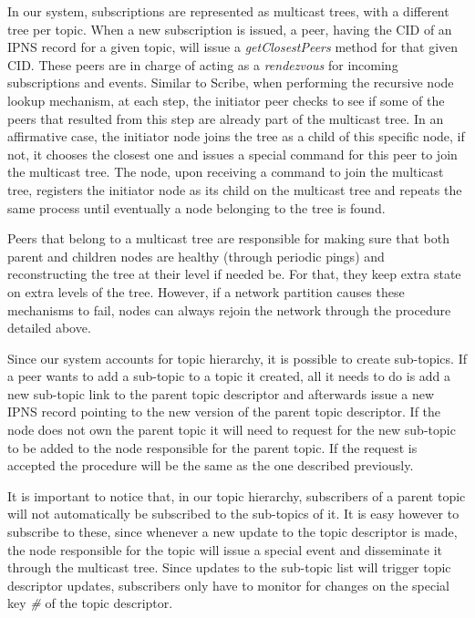 In our system, subscriptions are represented as multicast trees, with a
different tree per topic. When a new subscription is issued, a peer,
having the CID of an IPNS record for a given topic, will issue a
\emph{getClosestPeers} method for that given CID. These peers are in
charge of acting as a \emph{rendezvous} for incoming subscriptions and
events. Similar to Scribe, when performing the recursive node lookup
mechanism, at each step, the initiator peer checks to see if some of the
peers that resulted from this step are already part of the multicast
tree. In an affirmative case, the initiator node joins the tree as a
child of this specific node, if not, it chooses the closest one and
issues a special command for this peer to join the multicast tree. The
node, upon receiving a command to join the multicast tree, registers the
initiator node as its child on the multicast tree and repeats the
same process until eventually a node belonging to the tree is found.

Peers that belong to a multicast tree are responsible for making sure
that both parent and children nodes are healthy (through periodic pings)
and reconstructing the tree at their level if needed be. For that, they
keep extra state on extra levels of the tree. However, if a network
partition causes these mechanisms to fail, nodes can always rejoin the
network through the procedure detailed above.

Since our system accounts for topic hierarchy, it is possible to create
sub-topics. If a peer wants to add a sub-topic to a topic it created,
all it needs to do is add a new sub-topic link to the parent topic
descriptor and afterwards issue a new IPNS record pointing to the new
version of the parent topic descriptor. If the node does not own the
parent topic it will need to request for the new sub-topic to be added
to the node responsible for the parent topic. If the request is accepted
the procedure will be the same as the one described previously.

It is important to notice that, in our topic hierarchy, subscribers of a
parent topic will not automatically be subscribed to the sub-topics of
it. It is easy however to subscribe to these, since whenever a new
update to the topic descriptor is made, the node responsible for the
topic will issue a special event and disseminate it through the
multicast tree. Since updates to the sub-topic list will trigger topic
descriptor updates, subscribers only have to monitor for changes on the
special key \emph{\#} of the topic descriptor.


